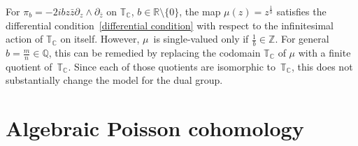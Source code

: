 \documentclass[10pt,a4paper]{amsart}
\numberwithin{equation}{section}
\begin{document}
\begin{Example}
For $\pi_b=-2ibz\bar{z}\partial_z\wedge\partial_{\bar{z}}$ on ${\mathbb T}_{\mathbb C}$, $b\in{\mathbb R}\setminus\{0\}$, the map $\mu(z)=z^{\frac{1}{b}}$ satisf\/ies the dif\/ferential condition~\eqref{differential condition} with respect to the inf\/initesimal action of ${\mathbb T}_{\mathbb C}$ on itself. However, $\mu$~is single-valued only if $\frac{1}{b}\in{\mathbb Z}$. For general $b=\frac{m}{n}\in\mathbb Q$, this can be remedied by replacing the codomain ${\mathbb T}_{\mathbb C}$ of $\mu$ with a f\/inite quotient of~${\mathbb T}_{\mathbb C}$. Since each of those quotients are isomorphic to~${\mathbb T}_{\mathbb C}$, this does not substantially change the model for the dual group.
\end{Example}

\section{Algebraic Poisson cohomology}
\end{document}
